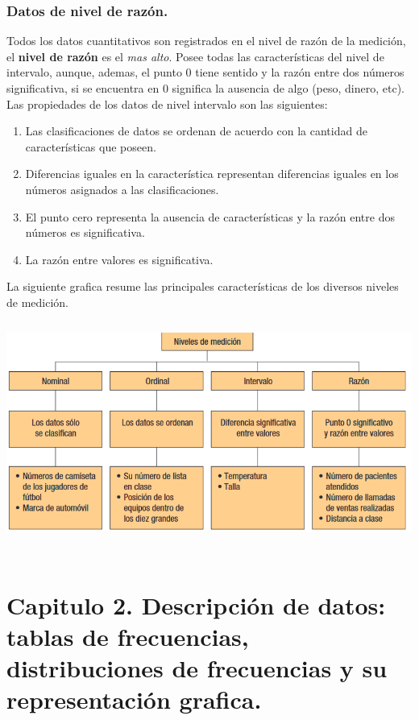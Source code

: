 \documentclass[]{article}
\begin{document}
\subsubsection*{Datos de nivel de razón.}
Todos los datos cuantitativos son registrados en el nivel de razón de la medición, el \textbf{nivel de razón} es el \textit{mas alto}. Posee todas las características del nivel de intervalo, aunque, ademas, el punto 0 tiene sentido y la razón entre dos números significativa, si se encuentra en 0 significa la ausencia de algo (peso, dinero, etc). Las propiedades de los datos de nivel intervalo son las siguientes:
\begin{enumerate}
	\item Las clasificaciones de datos se ordenan de acuerdo con la cantidad de características que poseen.
	\item Diferencias iguales en la característica representan diferencias iguales en los números asignados a las clasificaciones.
	\item El punto cero representa la ausencia de características y la razón entre dos números es significativa.
	\item La razón entre valores es significativa.
\end{enumerate}
La siguiente grafica resume las principales características de los diversos niveles de medición.
\\
\includegraphics[width=16cm, height=8cm]{imagenes/resumenCaracteristicasNivelesMedicion1_3}
\section{Capitulo 2. Descripción de datos: tablas de frecuencias, distribuciones de frecuencias y su representación grafica.}
\end{document}
